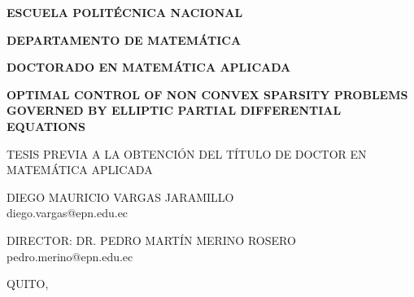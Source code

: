 \pagestyle{empty}
\begin{center}	\bf
	\LARGE { ESCUELA POLITÉCNICA NACIONAL}\vspace{8mm}
\end{center}


\begin{center}	\bf
	\Large {DEPARTAMENTO DE MATEMÁTICA}\vspace{3mm}
\end{center}

\begin{center}	\bf
	\Large {DOCTORADO EN MATEMÁTICA APLICADA}\vspace{15mm}
\end{center}

\begin{center}	\bf
	\Large {OPTIMAL CONTROL OF NON CONVEX SPARSITY PROBLEMS GOVERNED BY ELLIPTIC PARTIAL DIFFERENTIAL EQUATIONS}
	\vspace{20mm}
	
	\large{TESIS PREVIA A LA OBTENCIÓN DEL TÍTULO DE DOCTOR EN MATEMÁTICA APLICADA}\vspace{15mm}
	

	
	\normalsize{DIEGO MAURICIO VARGAS JARAMILLO}\\
	diego.vargas@epn.edu.ec\vspace{13mm}
	
	\normalsize{DIRECTOR: DR. PEDRO MARTÍN MERINO ROSERO}\\
	pedro.merino@epn.edu.ec\vspace{6mm}
	
	\vspace{15mm}
	
	\normalsize{QUITO, }
\end{center}